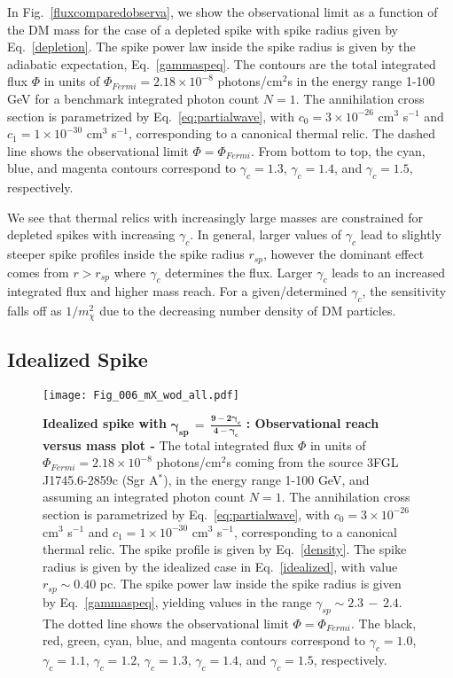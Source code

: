 \documentclass[11pt]{article}
\begin{document}
In Fig.~\ref{fluxcomparedobserva}, we show the observational limit as a function of the DM mass for the case of a depleted spike with spike radius given by Eq.~\ref{depletion}. The spike power law inside the spike radius is given by the adiabatic expectation, Eq.~\ref{gammaspeq}. The contours are the total integrated flux $\Phi$ in units of  $ \Phi_{Fermi} = 2.18 \times 10^{-8}$ photons/cm$^2$s in the energy range 1-100 GeV for a benchmark integrated photon count $N=1$. The annihilation cross section is parametrized by Eq.~\ref{eq:partialwave}, with $c_0 = 3 \times 10^{-26}$ cm$^{3}$ s$^{-1}$ and $c_1 = 1 \times 10^{-30}$ cm$^{3}$ s$^{-1}$, corresponding to a canonical thermal relic. The dashed line shows the observational limit $\Phi = \Phi_{Fermi}$. From bottom to top, the cyan, blue, and magenta contours correspond to $\gamma_c = 1.3$,  $\gamma_c = 1.4$, and  $\gamma_c = 1.5$, respectively.

We see that thermal relics with increasingly large masses are constrained for depleted spikes with increasing $\gamma_c$. %
In general, larger values of $\gamma_c$ lead to slightly steeper spike profiles inside the spike radius $r_{sp}$, however the dominant effect comes from $r>r_{sp}$ where $\gamma_c$ determines the flux.  Larger $\gamma_c$ leads to an increased integrated flux and higher mass reach.  For a given/determined $\gamma_c$, the sensitivity falls off as $1/m_\chi^2$ due to the decreasing number density of DM particles.

\subsection{Idealized Spike}

   \begin{figure}[ht]
  \centering
  {\texttt{[image: Fig\_006\_mX\_wod\_all.pdf]}}
    \caption{\textbf{Idealized spike with} $\mathbf{\gamma_{sp} \, = \, \frac{9-2 \gamma_c}{4 - \gamma_c}}$  \textbf{: Observational reach versus mass plot - } The total integrated flux $\Phi$ in units of  $ \Phi_{Fermi} = 2.18 \times 10^{-8}$ photons/cm$^2$s coming from the source 3FGL J1745.6-2859c (Sgr A$^*$), in the energy range 1-100 GeV, and assuming an integrated photon count $N=1$. The annihilation cross section is parametrized by Eq.~\ref{eq:partialwave}, with $c_0 = 3 \times 10^{-26}$ cm$^{3}$ s$^{-1}$ and $c_1 = 1 \times 10^{-30}$ cm$^{3}$ s$^{-1}$, corresponding to a canonical thermal relic. The spike profile is given by Eq.~\ref{density}. The spike radius is given by the idealized case in Eq.~\ref{idealized}, with value $r_{sp} \sim 0.40$ pc. The spike power law inside the spike radius is given by Eq.~\ref{gammaspeq}, yielding values in the range $\gamma_{sp} \sim 2.3 \, - \, 2.4$. The dotted line shows the observational limit $\Phi = \Phi_{Fermi}$.  The  black, red, green, cyan, blue, and magenta contours correspond to $\gamma_c = 1.0$, $\gamma_c = 1.1$, $\gamma_c = 1.2$, $\gamma_c = 1.3$,  $\gamma_c = 1.4$, and  $\gamma_c = 1.5$, respectively.}
    \label{fluxcomparedobservb}
\end{figure}
\end{document}
